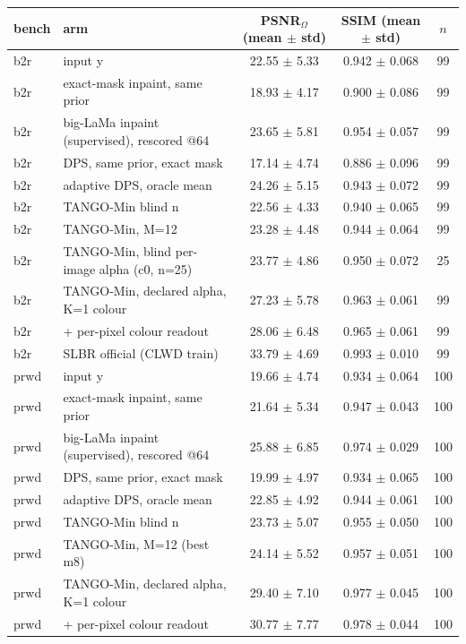 \begin{tabular}{llccc}
\toprule
bench & arm & PSNR$_\Omega$ (mean $\pm$ std) & SSIM (mean $\pm$ std) & $n$\\
\midrule
b2r & input y & 22.55 $\pm$ 5.33 & 0.942 $\pm$ 0.068 & 99\\
b2r & exact-mask inpaint, same prior & 18.93 $\pm$ 4.17 & 0.900 $\pm$ 0.086 & 99\\
b2r & big-LaMa inpaint (supervised), rescored @64 & 23.65 $\pm$ 5.81 & 0.954 $\pm$ 0.057 & 99\\
b2r & DPS, same prior, exact mask & 17.14 $\pm$ 4.74 & 0.886 $\pm$ 0.096 & 99\\
b2r & adaptive DPS, oracle mean & 24.26 $\pm$ 5.15 & 0.943 $\pm$ 0.072 & 99\\
b2r & TANGO-Min blind n & 22.56 $\pm$ 4.33 & 0.940 $\pm$ 0.065 & 99\\
b2r & TANGO-Min, M=12 & 23.28 $\pm$ 4.48 & 0.944 $\pm$ 0.064 & 99\\
b2r & TANGO-Min, blind per-image alpha (c0, n=25) & 23.77 $\pm$ 4.86 & 0.950 $\pm$ 0.072 & 25\\
b2r & TANGO-Min, declared alpha, K=1 colour & 27.23 $\pm$ 5.78 & 0.963 $\pm$ 0.061 & 99\\
b2r & + per-pixel colour readout & 28.06 $\pm$ 6.48 & 0.965 $\pm$ 0.061 & 99\\
b2r & SLBR official (CLWD train) & 33.79 $\pm$ 4.69 & 0.993 $\pm$ 0.010 & 99\\
\midrule
prwd & input y & 19.66 $\pm$ 4.74 & 0.934 $\pm$ 0.064 & 100\\
prwd & exact-mask inpaint, same prior & 21.64 $\pm$ 5.34 & 0.947 $\pm$ 0.043 & 100\\
prwd & big-LaMa inpaint (supervised), rescored @64 & 25.88 $\pm$ 6.85 & 0.974 $\pm$ 0.029 & 100\\
prwd & DPS, same prior, exact mask & 19.99 $\pm$ 4.97 & 0.934 $\pm$ 0.065 & 100\\
prwd & adaptive DPS, oracle mean & 22.85 $\pm$ 4.92 & 0.944 $\pm$ 0.061 & 100\\
prwd & TANGO-Min blind n & 23.73 $\pm$ 5.07 & 0.955 $\pm$ 0.050 & 100\\
prwd & TANGO-Min, M=12 (best m8) & 24.14 $\pm$ 5.52 & 0.957 $\pm$ 0.051 & 100\\
prwd & TANGO-Min, declared alpha, K=1 colour & 29.40 $\pm$ 7.10 & 0.977 $\pm$ 0.045 & 100\\
prwd & + per-pixel colour readout & 30.77 $\pm$ 7.77 & 0.978 $\pm$ 0.044 & 100\\

\end{tabular}
